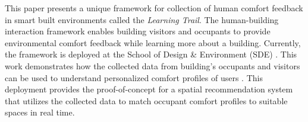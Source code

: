 This paper presents a unique framework for collection of human comfort feedback in smart built environments called the \emph{Learning Trail}. The human-building interaction framework enables building visitors and occupants to provide environmental comfort feedback while learning more about a building. Currently, the framework is deployed at  the School of Design \& Environment (SDE) . This work demonstrates how the collected data from building's occupants and visitors can be used to understand personalized comfort profiles of users . This deployment provides the proof-of-concept for a spatial recommendation system that utilizes the collected data to match occupant comfort profiles to suitable spaces in real time.\\








